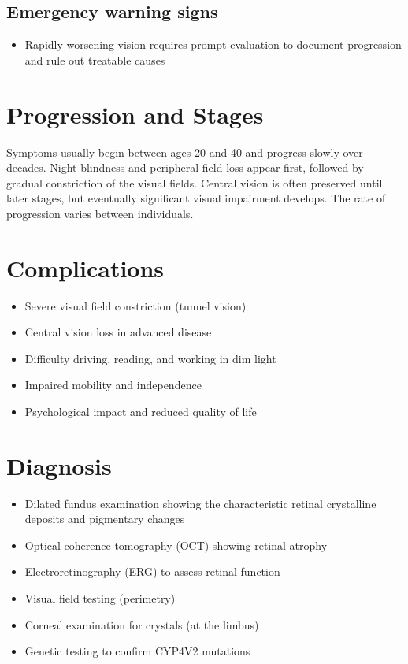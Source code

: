 \subsection{Emergency warning signs}
\begin{itemize}[noitemsep]
  \item Rapidly worsening vision requires prompt evaluation to document progression and rule out treatable causes
\end{itemize}
\section{Progression and Stages}
Symptoms usually begin between ages 20 and 40 and progress slowly over decades. Night blindness and peripheral field loss appear first, followed by gradual constriction of the visual fields. Central vision is often preserved until later stages, but eventually significant visual impairment develops. The rate of progression varies between individuals.
\section{Complications}
\begin{itemize}[noitemsep]
  \item Severe visual field constriction (tunnel vision)
  \item Central vision loss in advanced disease
  \item Difficulty driving, reading, and working in dim light
  \item Impaired mobility and independence
  \item Psychological impact and reduced quality of life
\end{itemize}
\section{Diagnosis}
\begin{itemize}[noitemsep]
  \item Dilated fundus examination showing the characteristic retinal crystalline deposits and pigmentary changes
  \item Optical coherence tomography (OCT) showing retinal atrophy
  \item Electroretinography (ERG) to assess retinal function
  \item Visual field testing (perimetry)
  \item Corneal examination for crystals (at the limbus)
  \item Genetic testing to confirm CYP4V2 mutations
\end{itemize}
